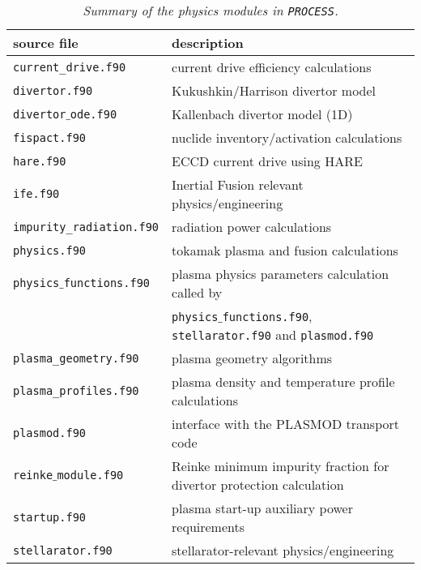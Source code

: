 \documentclass[11pt,a4paper]{report}
\newcommand{\process}{\mbox{\texttt{PROCESS}}}
\begin{document}
\begin{table}[tbph]
\begin{center}

\begin{tabular}{||l||l||} 
	\hline
source file                          & description \\
	\hline
\texttt{current\_drive.f90}          & current drive efficiency calculations \\
\texttt{divertor.f90}                & Kukushkin/Harrison divertor model     \\
\texttt{divertor$\_$ode.f90}         & Kallenbach divertor model (1D) \\
\texttt{fispact.f90}                 & nuclide inventory/activation calculations \\
\texttt{hare.f90}                    & ECCD current drive using HARE \\
\texttt{ife.f90}                     & Inertial Fusion relevant physics/engineering \\
\texttt{impurity\_radiation.f90}     & radiation power calculations \\
\texttt{physics.f90}                 & tokamak plasma and fusion calculations \\
\texttt{physics$\_$functions.f90}    & plasma physics parameters calculation called by \\
                                     & \texttt{physics$\_$functions.f90}, \texttt{stellarator.f90} and \texttt{plasmod.f90}\\
\texttt{plasma\_geometry.f90}        & plasma geometry algorithms \\
\texttt{plasma\_profiles.f90}        & plasma density and temperature profile calculations \\
\texttt{plasmod.f90}                 & interface with the PLASMOD transport code\\                                     
\texttt{reinke$\_$module.f90}        & Reinke minimum impurity fraction for divertor protection calculation \\                                                    
\texttt{startup.f90}                 & plasma start-up auxiliary power requirements \\
\texttt{stellarator.f90}             & stellarator-relevant physics/engineering \\
	\hline
\end{tabular}
\end{center}
\caption[Summary of physics modules]
{\label{tab:physics}
  \textit{Summary of the physics modules in \process.}
}
\end{table}
\end{document}
